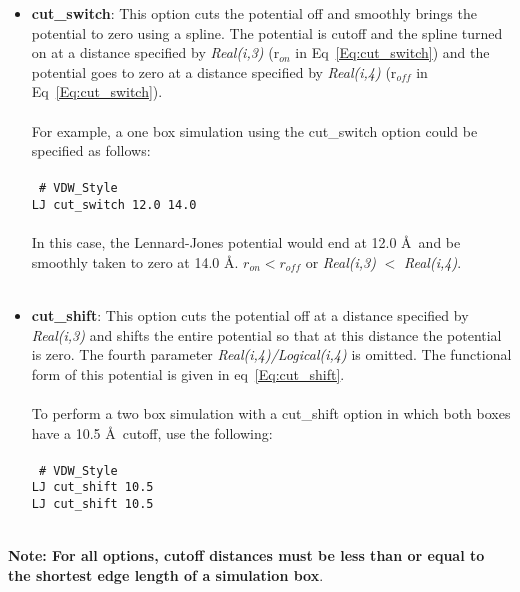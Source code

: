 \begin{itemize}
%
\item \textbf{cut\_switch}: This option cuts the potential off and smoothly
brings the potential to zero using a spline. The potential is cutoff
and the spline turned on at a distance specified by \emph{Real(i,3)}
(r$_{on}$ in Eq~\ref{Eq:cut_switch}) and the potential goes
to zero at a distance specified by \emph{Real(i,4)} (r$_{off}$ in
Eq~\ref{Eq:cut_switch}). \\ \\ 
% 
For example, a one box simulation using the cut\_switch option could be
specified as follows:
\\ \\
\texttt{
\# VDW\_Style \\
LJ cut\_switch 12.0 14.0} \\ \\
%
In this case, the Lennard-Jones potential would end at 12.0 \AA\ and
be smoothly taken to zero at 14.0 \AA. $r_{on} < r_{off}$ or \emph{Real(i,3)} $<$ \emph{Real(i,4)}.
%
\\ \\
\item \textbf{cut\_shift}: This option cuts the potential off at a distance
specified by \emph{Real(i,3)} and shifts the entire potential so that
at this distance the potential is zero. The fourth parameter
\emph{Real(i,4)/Logical(i,4)} is omitted. The functional form of this
potential is given in eq~\ref{Eq:cut_shift}. \\ \\
%
To perform a two box simulation with a cut\_shift option in which both
boxes have a 10.5 \AA\ cutoff, use the following:
\\ \\
\texttt{
\# VDW\_Style \\
LJ cut\_shift 10.5 \\
LJ cut\_shift 10.5 } \\ \\
%
\end{itemize}
{\bf Note: For all options, cutoff distances must be less than or
  equal to the shortest edge length of a simulation box}.
%
%
